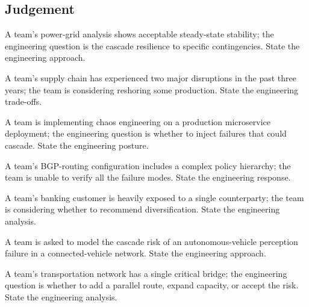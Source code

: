 \subsection*{Judgement}

\begin{exercise}
A team's power-grid analysis shows acceptable steady-state stability; the engineering question is the cascade resilience to specific contingencies. State the engineering approach.
\end{exercise}

\begin{exercise}
A team's supply chain has experienced two major disruptions in the past three years; the team is considering reshoring some production. State the engineering trade-offs.
\end{exercise}

\begin{exercise}
A team is implementing chaos engineering on a production microservice deployment; the engineering question is whether to inject failures that could cascade. State the engineering posture.
\end{exercise}

\begin{exercise}
A team's BGP-routing configuration includes a complex policy hierarchy; the team is unable to verify all the failure modes. State the engineering response.
\end{exercise}

\begin{exercise}
A team's banking customer is heavily exposed to a single counterparty; the team is considering whether to recommend diversification. State the engineering analysis.
\end{exercise}

\begin{exercise}
A team is asked to model the cascade risk of an autonomous-vehicle perception failure in a connected-vehicle network. State the engineering approach.
\end{exercise}

\begin{exercise}
A team's transportation network has a single critical bridge; the engineering question is whether to add a parallel route, expand capacity, or accept the risk. State the engineering analysis.
\end{exercise}
